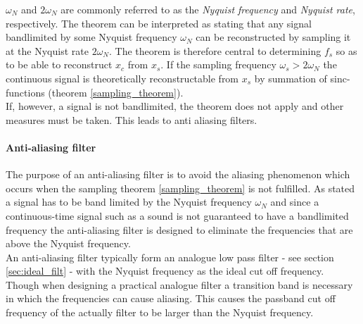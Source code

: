 $\omega_N$ and $2\omega_N$ are commonly referred to as the \textit{Nyquist frequency} and \textit{Nyquist rate}, respectively. The theorem can be interpreted as stating that any signal bandlimited by some Nyquist frequency $\omega_N$ can be reconstructed by sampling it at the Nyquist rate $2\omega_N$. The theorem is therefore central to determining $f_s$ so as to be able to reconstruct $x_c$ from $x_s$. If the sampling frequency $\omega_s>2\omega_N$ the continuous signal is theoretically reconstructable from $x_s$ by summation of sinc-functions (theorem \ref{sampling_theorem}).\\
If, however, a signal is not bandlimited, the theorem does not apply and other measures must be taken. This leads to anti aliasing filters. 

\paragraph{Anti-aliasing filter}
The purpose of an anti-aliasing filter is to avoid the aliasing phenomenon which occurs when the sampling theorem \ref{sampling_theorem} is not fulfilled. As stated a signal has to be band limited by the Nyquist frequency $\omega_N$ and since a continuous-time signal such as a sound is not guaranteed to have a bandlimited frequency the anti-aliasing filter is designed to eliminate the frequencies that are above the Nyquist frequency. \\
An anti-aliasing filter typically form an analogue low pass filter - see section \ref{sec:ideal_filt} -  with the Nyquist frequency as the ideal cut off frequency. Though when designing a practical analogue filter a transition band is necessary in which the frequencies can cause aliasing. This causes the passband cut off frequency of the actually filter to be larger than the Nyquist frequency. 

